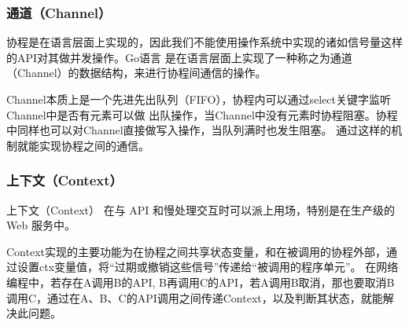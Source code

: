\documentclass[twoside]{CUGThesis}
\begin{document}
	\subsubsection{通道（Channel）}
	协程是在语言层面上实现的，因此我们不能使用操作系统中实现的诸如信号量这样的API对其做并发操作。Go语言
	是在语言层面上实现了一种称之为通道（Channel）的数据结构，来进行协程间通信的操作。\par 
	Channel本质上是一个先进先出队列（FIFO），协程内可以通过select关键字监听Channel中是否有元素可以做
	出队操作，当Channel中没有元素时协程阻塞。协程中同样也可以对Channel直接做写入操作，当队列满时也发生阻塞。
	通过这样的机制就能实现协程之间的通信。
	\subsubsection{上下文（Context）}
	上下文（Context） 在与 API 和慢处理交互时可以派上用场，特别是在生产级的 Web 服务中。\par 
	Context实现的主要功能为在协程之间共享状态变量，和在被调用的协程外部，通过设置ctx变量值，将“过期或撤销这些信号”传递给“被调用的程序单元”。
在网络编程中，若存在A调用B的API, B再调用C的API，若A调用B取消，那也要取消B调用C，通过在A、B、C的API调用之间传递Context，以及判断其状态，就能解决此问题。

	
	
\end{document}
